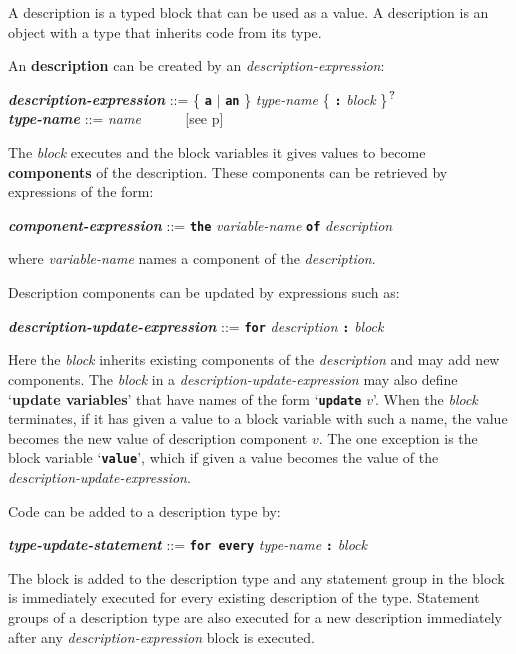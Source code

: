 \documentclass[12pt]{article}
\newcommand{\TT}[1]{{\tt \bfseries #1}}
\newcommand{\key}[1]{{\rm \bfseries #1}}
\newcommand{\ttkey}[1]{{\tt \bfseries #1}}
\newcommand{\emkey}[1]{{\em \bfseries #1}}
\newcommand{\pagref}[1]{p\pageref{#1}}
\newcommand{\QMARK}{{$^{\,\mbox{\footnotesize ?}}$}}
\newenvironment{indpar}[1][0.3in]%
	{\begin{list}{}%
		     {\setlength{\itemsep}{0in}%
		      \setlength{\topsep}{0in}%
		      \setlength{\parsep}{1ex}%
		      \setlength{\labelwidth}{#1}%
		      \setlength{\leftmargin}{#1}%
		      \addtolength{\leftmargin}{\labelsep}}%
	 \item}%
	{\end{list}}
\begin{document}
A description is a typed block that can be used as a value.
A description is an object with a type that inherits code from its type.

An \key{description} can be created by an {\em description-expression}:

\begin{indpar}
\emkey{description-expression} ::=
       \{ \ttkey{a} $|$ \ttkey{an} \} {\em type-name}
		              \{ \TT{:} {\em block} \}\QMARK{} \\[1ex]
\emkey{type-name} ::= {\em name} ~~~~~ [see \pagref{NAME}]
\end{indpar}

The {\em block} executes and the block variables it gives values to
become \key{components} of the description.
These components can be retrieved by expressions of the form:

\begin{indpar}
\emkey{component-expression} ::=
    \ttkey{the}
    {\em variable-name}
    \ttkey{of}
    {\em description}
\end{indpar}

where {\em variable-name} names a component of the {\em description}.

Description components can be updated by
expressions such as:

\begin{indpar}
\emkey{description-update-expression} ::=
    \ttkey{for}
    {\em description} \TT{:} {\em block}
\end{indpar}

Here the {\em block} inherits existing components of the {\em description}
and may add new components.  The {\em block} in a
{\em description-update-expression} may also define `\key{update variables}'
that have names of the form `\TT{update} $v$'.  When the {\em block}
terminates, if it has given a value to a block variable with such a name,
the value becomes the new value of description component $v$.
The one exception is the block variable `\TT{value}', which if
given a value becomes the value of the {\em description-update-expression}.

Code can be added to a description type by:
\begin{indpar}
\emkey{type-update-statement} ::=
    \ttkey{for every}
    {\em type-name} \TT{:} {\em block}
\end{indpar}

The block is added to the description type and any statement group
in the block is immediately executed for every existing description
of the type.  Statement groups of a description type are also executed
for a new description immediately after any {\em description-expression}
block is executed.
\end{document}
